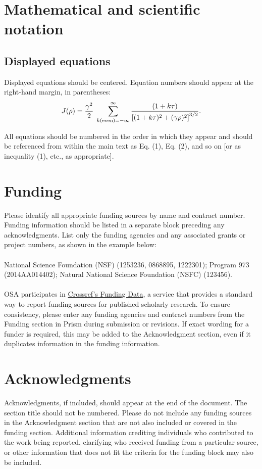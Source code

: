 \documentclass{osa-article}
\begin{document}
\section{Mathematical and scientific notation}

\subsection{Displayed equations} Displayed equations should be centered.
Equation numbers should appear at the right-hand margin, in
parentheses:
\begin{equation}
J(\rho) =
 \frac{\gamma^2}{2} \; \sum_{k({\rm even}) = -\infty}^{\infty}
	\frac{(1 + k \tau)}{ \left[ (1 + k \tau)^2 + (\gamma  \rho)^2  \right]^{3/2} }.
\end{equation}

All equations should be numbered in the order in which they appear
and should be referenced  from within the main text as Eq. (1),
Eq. (2), and so on [or as inequality (1), etc., as appropriate].


\section*{Funding}
Please identify all appropriate funding sources by name and contract number. Funding information should be listed in a separate block preceding any acknowledgments. List only the funding agencies and any associated grants or project numbers, as shown in the example below:\\
\\
National Science Foundation (NSF) (1253236, 0868895, 1222301); Program 973 (2014AA014402); Natural National Science Foundation (NSFC) (123456).\\
\\
OSA participates in \href{https://www.crossref.org/fundingdata/}{Crossref's Funding Data}, a service that provides a standard way to report funding sources for published scholarly research. To ensure consistency, please enter any funding agencies and contract numbers from the Funding section in Prism during submission or revisions. If exact wording for a funder is required, this may be added to the Acknowledgment section, even if it duplicates information in the funding information. 

\section*{Acknowledgments}
Acknowledgments, if included, should appear at the end of the document. The section title should not be numbered. Please do not include any funding sources in the Acknowledgment section that are not also included or covered in the funding section. Additional information crediting individuals who contributed to the work being reported, clarifying who received funding from a particular source, or other information that does not fit the criteria for the funding block may also be included.
\end{document}
